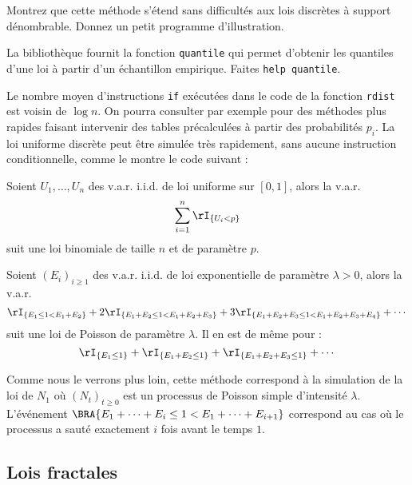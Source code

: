 \begin{exo}
  Montrez que cette méthode s'étend sans difficultés aux lois discrètes à
  support dénombrable. Donnez un petit programme d'illustration.
\end{exo}
La bibliothèque \SB{} fournit la fonction \texttt{quantile} qui permet
d'obtenir les quantiles d'une loi à partir d'un échantillon empirique. Faites
\texttt{help quantile}.

Le nombre moyen d'instructions \texttt{if} exécutées dans le code de la
fonction \texttt{rdist} est voisin de $\log n$. On pourra consulter par
exemple \cite{knuth-taocp-2-3} pour des méthodes plus rapides faisant
intervenir des tables précalculées à partir des probabilités $p_i$. La loi
uniforme discrète peut être simulée très rapidement, sans aucune instruction
conditionnelle, comme le montre le code suivant :
%
%

\begin{thm}
  Soient $U_1,\ldots,U_n$ des v.a.r. i.i.d. de loi uniforme sur $[0,1]$,
  alors la v.a.r. 
  $$
  \sum_{i=1}^n \rI_{\{U_i < p\}}
  $$
  suit une loi binomiale de taille $n$ et de paramètre $p$.
\end{thm}

\begin{thm}
  Soient $(E_i)_{i\geq 1}$ des v.a.r. i.i.d. de loi exponentielle de paramètre
  $\lambda >0$, alors la v.a.r.
  $$
  \rI_{\{E_1\leq 1 < E_1+E_2\}} 
  + 2 \rI_{\{E_1+E_2\leq 1 < E_1+E_2+E_3\}}
  + 3 \rI_{\{E_1+E_2+E_3\leq 1 < E_1+E_2+E_3+E_4\}}
  + \cdots
  $$
  suit une loi de Poisson de paramètre $\lambda$. Il en est de même pour :
  $$
  \rI_{\{E_1\leq 1\}} 
  + \rI_{\{E_1+E_2\leq 1\}}
  + \rI_{\{E_1+E_2+E_3\leq 1\}}
  + \cdots
  $$
\end{thm}
Comme nous le verrons plus loin, cette méthode correspond à la simulation de
la loi de $N_1$ où $(N_t)_{t\geq 0}$ est un processus de Poisson simple
d'intensité $\lambda$. L'événement $\BRA{E_1+\cdots+E_i \leq 1 < E_1+\cdots+E_{i+1}}$ correspond
au cas où le processus a sauté exactement $i$ fois avant le temps $1$.

%
\subsection{Lois fractales}
\label{ss:lois-fractales}
%

